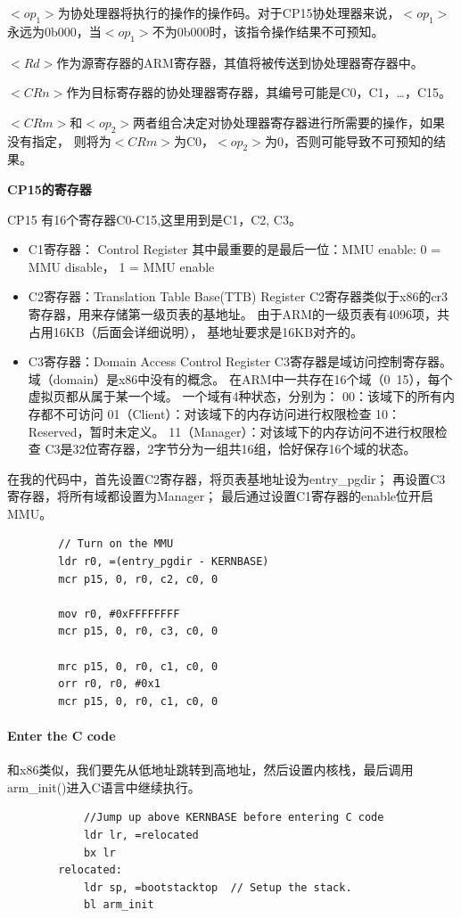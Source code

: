 \documentclass[11pt,a4paper]{article}
\begin{document}
\begin{CJK}{UTF8}{gkai}
\begin{itemize}
		$<op_1>$为协处理器将执行的操作的操作码。对于CP15协处理器来说，$<op_1>$
		永远为0b000，当$<op_1>$不为0b000时，该指令操作结果不可预知。
			
			
			$<Rd>$作为源寄存器的ARM寄存器，其值将被传送到协处理器寄存器中。
			
		$<CRn>$作为目标寄存器的协处理器寄存器，其编号可能是C0，C1，…，C15。
			
		$<CRm>$和$<op_2>$两者组合决定对协处理器寄存器进行所需要的操作，如果没有指定，
		则将为$<CRm>$为C0，$<op_2>$为0，否则可能导致不可预知的结果。
		\end{itemize}
		
		
		\textbf{CP15的寄存器}
		
		CP15 有16个寄存器C0-C15,这里用到是C1，C2, C3。
		
		\begin{itemize}
			\item C1寄存器： Control Register 
				其中最重要的是最后一位：MMU enable:
					0 = MMU disable，
					1 = MMU enable
			\item C2寄存器：Translation Table Base(TTB) Register
				C2寄存器类似于x86的cr3寄存器，用来存储第一级页表的基地址。 
				由于ARM的一级页表有4096项，共占用16KB（后面会详细说明），
				基地址要求是16KB对齐的。
			\item C3寄存器：Domain Access Control Register
				C3寄存器是域访问控制寄存器。域（domain）是x86中没有的概念。
				在ARM中一共存在16个域（0~15），每个虚拟页都从属于某一个域。
				一个域有4种状态，分别为：
					00：该域下的所有内存都不可访问
					01（Client）：对该域下的内存访问进行权限检查
					10：Reserved，暂时未定义。
					11（Manager）：对该域下的内存访问不进行权限检查
				C3是32位寄存器，2字节分为一组共16组，恰好保存16个域的状态。
		\end{itemize}
		在我的代码中，首先设置C2寄存器，将页表基地址设为entry\_pgdir；
		再设置C3寄存器，将所有域都设置为Manager；
		最后通过设置C1寄存器的enable位开启MMU。
		
		\begin{lstlisting}
		// Turn on the MMU
		ldr r0, =(entry_pgdir - KERNBASE)
		mcr p15, 0, r0, c2, c0, 0
		
		mov r0, #0xFFFFFFFF
		mcr p15, 0, r0, c3, c0, 0
		
		mrc p15, 0, r0, c1, c0, 0
		orr r0, r0, #0x1
		mcr p15, 0, r0, c1, c0, 0
		\end{lstlisting}
		
		\paragraph{Enter the C code}
		和x86类似，我们要先从低地址跳转到高地址，然后设置内核栈，最后调用arm\_init()进入C语言中继续执行。
			\begin{lstlisting}
			//Jump up above KERNBASE before entering C code
			ldr lr, =relocated
			bx lr
		relocated:
			ldr sp, =bootstacktop  // Setup the stack.
			bl arm_init
		

\end{lstlisting}
\end{CJK}
\end{document}
